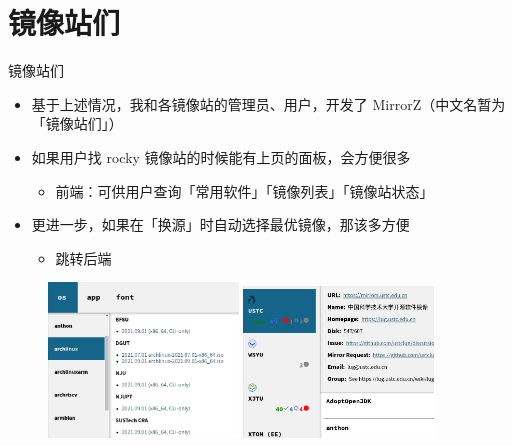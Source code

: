 \documentclass{ctexbeamer}
\begin{document}
\section{镜像站们}
\begin{frame}{镜像站们}
  \begin{itemize}
    \item 基于上述情况，我和各镜像站的管理员、用户，开发了 MirrorZ（中文名暂为「镜像站们」）
    \item 如果用户找 rocky 镜像站的时候能有上页的面板，会方便很多\begin{itemize}
      \item 前端：可供用户查询「常用软件」「镜像列表」「镜像站状态」
    \end{itemize}
    \item 更进一步，如果在「换源」时自动选择最优镜像，那该多方便\begin{itemize}
      \item 跳转后端
    \end{itemize}
  \end{itemize}
  \begin{figure}
    \centering
    \includegraphics[width=0.45\textwidth]{img/archlinux.png}
    \qquad
    \includegraphics[width=0.45\textwidth]{img/ustc-status.png}
  \end{figure}
\end{frame}
\end{document}
